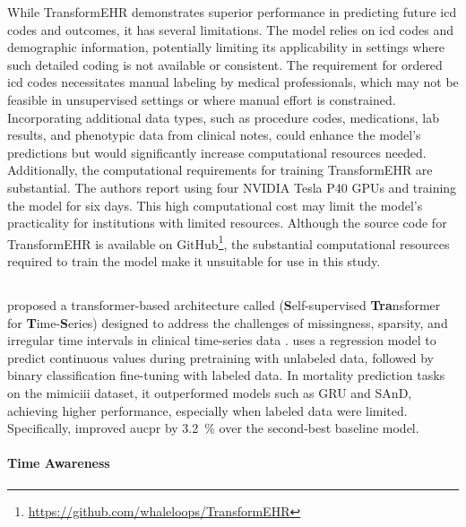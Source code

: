 While TransformEHR demonstrates superior performance in predicting future \gls{icd} codes and outcomes, it has several limitations. The model relies on \gls{icd} codes and demographic information, potentially limiting its applicability in settings where such detailed coding is not available or consistent. The requirement for ordered \gls{icd} codes necessitates manual labeling by medical professionals, which may not be feasible in unsupervised settings or where manual effort is constrained. Incorporating additional data types, such as procedure codes, medications, lab results, and phenotypic data from clinical notes, could enhance the model's predictions but would significantly increase computational resources needed. Additionally, the computational requirements for training TransformEHR are substantial. The authors report using four NVIDIA Tesla P40 GPUs and training the model for six days. This high computational cost may limit the model's practicality for institutions with limited resources. Although the source code for TransformEHR is available on GitHub\footnote{\url{https://github.com/whaleloops/TransformEHR}}, the substantial computational resources required to train the model make it unsuitable for use in this study.

\subsection{}

\textcite{STraTS2022} proposed a transformer-based architecture called  (\textbf{S}elf-supervised \textbf{Tra}nsformer for \textbf{T}ime-\textbf{S}eries) designed to address the challenges of missingness, sparsity, and irregular time intervals in clinical time-series data \cite{STraTS2022}.  uses a regression model to predict continuous values during pretraining with unlabeled data, followed by binary classification fine-tuning with labeled data. In mortality prediction tasks on the \gls{mimiciii} dataset, it outperformed models such as GRU and SAnD, achieving higher performance, especially when labeled data were limited. Specifically,  improved \gls{aucpr} by \qty{3.2}{\percent} over the second-best baseline model.

\paragraph{Time Awareness}

